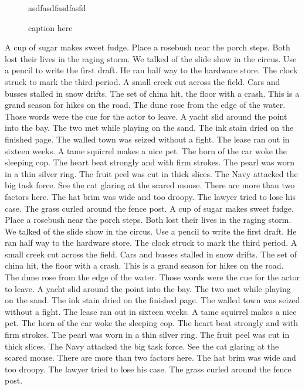 \documentclass[
  letterpaper,
  DIV=11,
  numbers=noendperiod]{scrartcl}
\begin{document}
\begin{figure}
\centering

asdfasdfasdfasfd

\caption{caption here}
\vspace{-3pt}
\end{figure}

A cup of sugar makes sweet fudge. Place a rosebush near the porch steps.
Both lost their lives in the raging storm. We talked of the slide show
in the circus. Use a pencil to write the first draft. He ran half way to
the hardware store. The clock struck to mark the third period. A small
creek cut across the field. Cars and busses stalled in snow drifts. The
set of china hit, the floor with a crash. This is a grand season for
hikes on the road. The dune rose from the edge of the water. Those words
were the cue for the actor to leave. A yacht slid around the point into
the bay. The two met while playing on the sand. The ink stain dried on
the finished page. The walled town was seized without a fight. The lease
ran out in sixteen weeks. A tame squirrel makes a nice pet. The horn of
the car woke the sleeping cop. The heart beat strongly and with firm
strokes. The pearl was worn in a thin silver ring. The fruit peel was
cut in thick slices. The Navy attacked the big task force. See the cat
glaring at the scared mouse. There are more than two factors here. The
hat brim was wide and too droopy. The lawyer tried to lose his case. The
grass curled around the fence post. A cup of sugar makes sweet fudge.
Place a rosebush near the porch steps. Both lost their lives in the
raging storm. We talked of the slide show in the circus. Use a pencil to
write the first draft. He ran half way to the hardware store. The clock
struck to mark the third period. A small creek cut across the field.
Cars and busses stalled in snow drifts. The set of china hit, the floor
with a crash. This is a grand season for hikes on the road. The dune
rose from the edge of the water. Those words were the cue for the actor
to leave. A yacht slid around the point into the bay. The two met while
playing on the sand. The ink stain dried on the finished page. The
walled town was seized without a fight. The lease ran out in sixteen
weeks. A tame squirrel makes a nice pet. The horn of the car woke the
sleeping cop. The heart beat strongly and with firm strokes. The pearl
was worn in a thin silver ring. The fruit peel was cut in thick slices.
The Navy attacked the big task force. See the cat glaring at the scared
mouse. There are more than two factors here. The hat brim was wide and
too droopy. The lawyer tried to lose his case. The grass curled around
the fence post.
\end{document}
